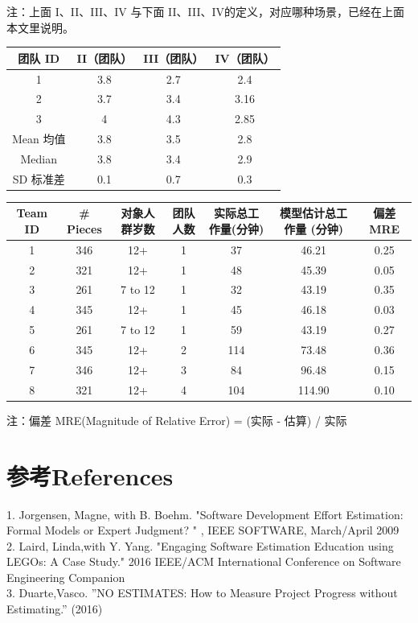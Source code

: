 注：上面 I、II、III、IV 与下面 II、III、IV的定义，对应哪种场景，已经在上面本文里说明。



\begin{tabular}{|c|c|c|c|}
\hline
团队 ID&II（团队）&III（团队）&IV（团队）\\
\hline
1&3.8&2.7&2.4\\
\hline
2&3.7&3.4&3.16\\
\hline
3&4&4.3&2.85\\
\hline
Mean 均值&3.8&3.5&2.8\\
\hline
Median&3.8&3.4&2.9\\
\hline
SD 标准差&0.1&0.7&0.3\\
\hline
\end{tabular}


\begin{tabular}{|c|c|c|c|c|c|c|}
\hline
Team ID&\# Pieces&对象人群岁数&团队人数&实际总工作量(分钟)&模型估计总工作量 (分钟)&偏差 MRE \\
\hline
1&346&12+&1&37&46.21&0.25\\
\hline
2&321&12+&1&48&45.39&0.05\\
\hline
3&261&7 to 12&1&32&43.19&0.35\\
\hline
4&345&12+&1&45&46.18&0.03\\
\hline
5&261&7 to 12&1&59&43.19&0.27\\
\hline
6&345&12+&2&114&73.48&0.36\\
\hline
7&346&12+&3&84&96.48&0.15\\
\hline
8&321&12+&4&104&114.90&0.10\\
\hline
\end{tabular}


注：偏差 MRE(Magnitude of Relative Error) = \textbar{} (实际 - 估算)
\textbar{} / 实际

\hypertarget{references}{%
\section{参考References}\label{references}}

1. Jorgensen, Magne, with B. Boehm. "Software Development Effort Estimation: Formal Models or Expert Judgment? " , IEEE SOFTWARE, March/April 2009 \\
2. Laird, Linda,with Y. Yang. "Engaging Software Estimation Education using LEGOs: A Case Study." 2016 IEEE/ACM International Conference on Software Engineering Companion\\
3. Duarte,Vasco. ''NO ESTIMATES: How to Measure Project Progress without Estimating.'' (2016)\\


